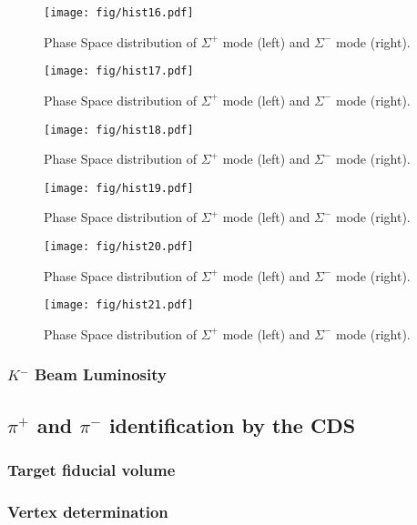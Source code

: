 \begin{figure}
\texttt{[image: fig/hist16.pdf]}
\caption{Phase Space distribution of $\Sigma^+$ mode (left) and $\Sigma^-$ mode (right).}
\end{figure}

\begin{figure}
\texttt{[image: fig/hist17.pdf]}
\caption{Phase Space distribution of $\Sigma^+$ mode (left) and $\Sigma^-$ mode (right).}
\end{figure}

\begin{figure}
\texttt{[image: fig/hist18.pdf]}
\caption{Phase Space distribution of $\Sigma^+$ mode (left) and $\Sigma^-$ mode (right).}
\end{figure}

\begin{figure}
\texttt{[image: fig/hist19.pdf]}
\caption{Phase Space distribution of $\Sigma^+$ mode (left) and $\Sigma^-$ mode (right).}
\end{figure}

\begin{figure}
\texttt{[image: fig/hist20.pdf]}
\caption{Phase Space distribution of $\Sigma^+$ mode (left) and $\Sigma^-$ mode (right).}
\end{figure}

\begin{figure}
\texttt{[image: fig/hist21.pdf]}
\caption{Phase Space distribution of $\Sigma^+$ mode (left) and $\Sigma^-$ mode (right).}
\end{figure}



\subsubsection{$K^-$ Beam Luminosity}



\subsection{$\pi^{+}$ and $\pi^{-}$ identification by the CDS}


\subsubsection{Target fiducial volume}

\subsubsection{Vertex determination}


